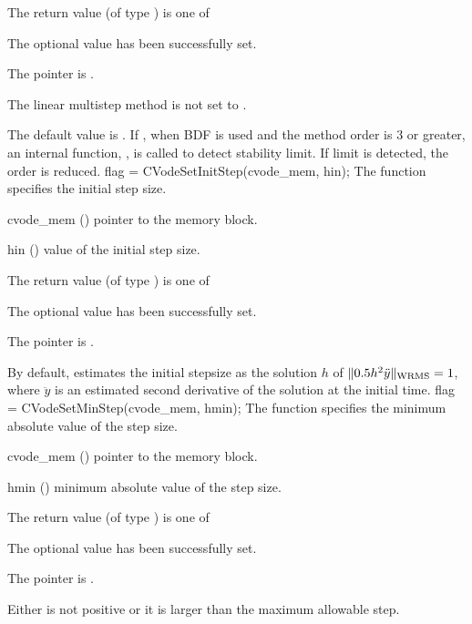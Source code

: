 {
  The return value  (of type ) is one of
  \begin{args}
  \item[\Id{CV\_SUCCESS}] 
    The optional value has been successfully set.
  \item[\Id{CV\_MEM\_NULL}]
    The  pointer is .
  \item[\Id{CV\_ILL\_INPUT}]
    The linear multistep method is not set to .
  \end{args}
}
{
  The default value is . If , when BDF is used
  and the method order is 3 or greater, an internal function, ,
  is called to detect stability limit. If limit is detected, the order is reduced.
}
{
flag = CVodeSetInitStep(cvode\_mem, hin);
}
{
  The function  specifies the initial step size.
}
{
  \begin{args}
  \item[cvode\_mem] ()
    pointer to the {\cvode} memory block.
  \item[hin] ()
    value of the initial step size.
  \end{args}
}
{
  The return value  (of type ) is one of
  \begin{args}
  \item[\Id{CV\_SUCCESS}] 
    The optional value has been successfully set.
  \item[\Id{CV\_MEM\_NULL}]
    The  pointer is .
  \end{args}
}
{
  By default, {\cvode} estimates the initial stepsize as the solution $h$ 
  of $\| 0.5 h^2 \ddot y \|_{\mbox{\scriptsize WRMS}} = 1$,
  where $\ddot y$ is an estimated second derivative of the solution at the
  initial time.
}
{
flag = CVodeSetMinStep(cvode\_mem, hmin);
}
{
  The function  specifies the minimum absolute
  value of the step size.
}
{
  \begin{args}
  \item[cvode\_mem] ()
    pointer to the {\cvode} memory block.
  \item[hmin] ()
    minimum absolute value of the step size.
  \end{args}
}
{
  The return value  (of type ) is one of
  \begin{args}
  \item[\Id{CV\_SUCCESS}] 
    The optional value has been successfully set.
  \item[\Id{CV\_MEM\_NULL}]
    The  pointer is .
  \item[\Id{CV\_ILL\_INPUT}]
    Either  is not positive or it is larger than the maximum allowable step.
  \end{args}
}
